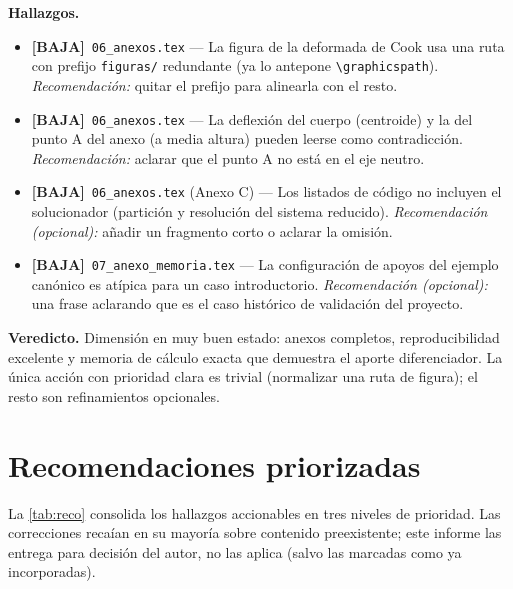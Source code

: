 \documentclass[11pt,a4paper]{article}
\newcommand{\sevbaja}{\textcolor{cBaja}{\textbf{[BAJA]}}}
\newcommand{\fileref}[1]{\texttt{\small #1}}
\begin{document}
\textbf{Hallazgos.}
\begin{itemize}
  \item \sevbaja\ \fileref{06\_anexos.tex} — La figura de la deformada de Cook usa una ruta con prefijo \texttt{figuras/} redundante (ya lo antepone \texttt{\textbackslash graphicspath}). \textit{Recomendación:} quitar el prefijo para alinearla con el resto.
  \item \sevbaja\ \fileref{06\_anexos.tex} — La deflexión del cuerpo (centroide) y la del punto A del anexo (a media altura) pueden leerse como contradicción. \textit{Recomendación:} aclarar que el punto A no está en el eje neutro.
  \item \sevbaja\ \fileref{06\_anexos.tex} (Anexo C) — Los listados de código no incluyen el solucionador (partición y resolución del sistema reducido). \textit{Recomendación (opcional):} añadir un fragmento corto o aclarar la omisión.
  \item \sevbaja\ \fileref{07\_anexo\_memoria.tex} — La configuración de apoyos del ejemplo canónico es atípica para un caso introductorio. \textit{Recomendación (opcional):} una frase aclarando que es el caso histórico de validación del proyecto.
\end{itemize}

\textbf{Veredicto.} Dimensión en muy buen estado: anexos completos, reproducibilidad excelente y memoria
de cálculo exacta que demuestra el aporte diferenciador. La única acción con prioridad clara es trivial
(normalizar una ruta de figura); el resto son refinamientos opcionales.

\section{Recomendaciones priorizadas}

La \autoref{tab:reco} consolida los hallazgos accionables en tres niveles de prioridad. Las
correcciones recaían en su mayoría sobre contenido preexistente; este informe las entrega para
decisión del autor, no las aplica (salvo las marcadas como ya incorporadas).
\end{document}

